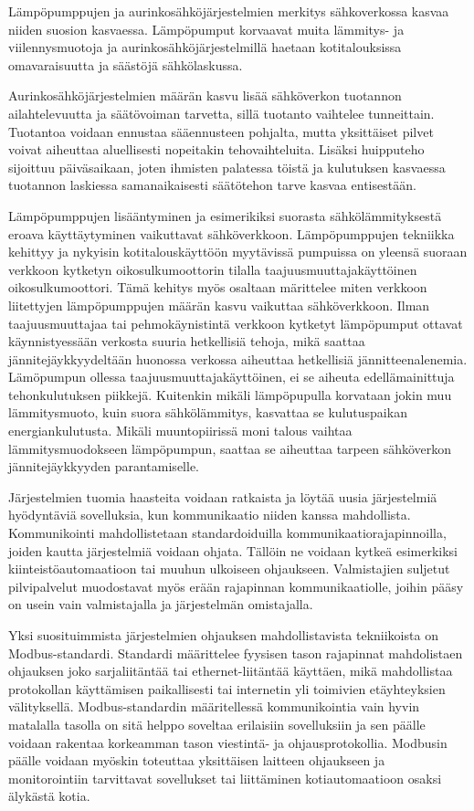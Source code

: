 Lämpöpumppujen ja aurinkosähköjärjestelmien merkitys sähkoverkossa kasvaa niiden suosion kasvaessa. Lämpöpumput korvaavat muita lämmitys- ja viilennysmuotoja ja aurinkosähköjärjestelmillä haetaan kotitalouksissa omavaraisuutta ja säästöjä sähkölaskussa. 

Aurinkosähköjärjestelmien määrän kasvu lisää sähköverkon tuotannon ailahtelevuutta ja säätövoiman tarvetta, sillä tuotanto vaihtelee tunneittain. Tuotantoa voidaan ennustaa sääennusteen pohjalta, mutta yksittäiset pilvet voivat aiheuttaa aluellisesti nopeitakin tehovaihteluita. Lisäksi huipputeho sijoittuu päiväsaikaan, joten ihmisten palatessa töistä ja kulutuksen kasvaessa tuotannon laskiessa samanaikaisesti säätötehon tarve kasvaa entisestään. 

Lämpöpumppujen lisääntyminen ja esimerikiksi suorasta sähkölämmityksestä eroava käyttäytyminen vaikuttavat sähköverkkoon. Lämpöpumppujen tekniikka kehittyy ja nykyisin kotitalouskäyttöön myytävissä pumpuissa on yleensä suoraan verkkoon kytketyn oikosulkumoottorin tilalla taajuusmuuttajakäyttöinen oikosulkumoottori. Tämä kehitys myös osaltaan märittelee miten verkkoon liitettyjen lämpöpumppujen määrän kasvu vaikuttaa sähköverkkoon. Ilman taajuusmuuttajaa tai pehmokäynistintä verkkoon kytketyt lämpöpumput ottavat käynnistyessään verkosta suuria hetkellisiä tehoja, mikä saattaa jännitejäykkyydeltään huonossa verkossa aiheuttaa hetkellisiä jännitteenalenemia. Lämöpumpun ollessa taajuusmuuttajakäyttöinen, ei se aiheuta edellämainittuja tehonkulutuksen piikkejä. Kuitenkin mikäli lämpöpupulla korvataan jokin muu lämmitysmuoto, kuin suora sähkölämmitys, kasvattaa se kulutuspaikan energiankulutusta. Mikäli muuntopiirissä moni talous vaihtaa lämmitysmuodokseen lämpöpumpun, saattaa se aiheuttaa tarpeen sähköverkon jännitejäykkyyden parantamiselle.

Järjestelmien tuomia haasteita voidaan ratkaista ja löytää uusia järjestelmiä hyödyntäviä sovelluksia, kun kommunikaatio niiden kanssa mahdollista. Kommunikointi mahdollistetaan standardoiduilla kommunikaatiorajapinnoilla, joiden kautta järjestelmiä voidaan ohjata. Tällöin ne voidaan kytkeä esimerkiksi kiinteistöautomaatioon tai muuhun ulkoiseen ohjaukseen. Valmistajien suljetut pilvipalvelut muodostavat myös erään rajapinnan kommunikaatiolle, joihin pääsy on usein vain valmistajalla ja järjestelmän omistajalla. 

Yksi suosituimmista järjestelmien ohjauksen mahdollistavista tekniikoista on Modbus-standardi. Standardi määrittelee fyysisen tason rajapinnat mahdolistaen ohjauksen joko sarjaliitäntää tai ethernet-liitäntää käyttäen, mikä mahdollistaa protokollan käyttämisen paikallisesti tai internetin yli toimivien etäyhteyksien välityksellä. Modbus-standardin määritellessä kommunikointia vain hyvin matalalla tasolla on sitä helppo soveltaa erilaisiin sovelluksiin ja sen päälle voidaan rakentaa korkeamman tason viestintä- ja ohjausprotokollia. Modbusin päälle voidaan myöskin toteuttaa yksittäisen laitteen ohjaukseen ja monitorointiin tarvittavat sovellukset tai liittäminen kotiautomaatioon osaksi älykästä kotia. 

